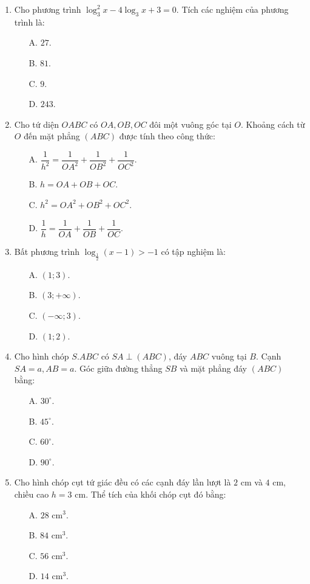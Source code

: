 \documentclass[12pt, a4paper]{article}
\begin{document}
\begin{enumerate}[leftmargin=0.8cm]
    \item Cho phương trình $\log_3^2 x - 4\log_3 x + 3 = 0$. Tích các nghiệm của phương trình là:
    \begin{enumerate}[leftmargin=0.6cm]
        \item[A.] $27$.
        \item[B.] $81$.
        \item[C.] $9$.
        \item[D.] $243$.
    \end{enumerate}

    \item Cho tứ diện $OABC$ có $OA, OB, OC$ đôi một vuông góc tại $O$. Khoảng cách từ $O$ đến mặt phẳng $(ABC)$ được tính theo công thức:
    \begin{enumerate}[leftmargin=0.6cm]
        \item[A.] $\dfrac{1}{h^2} = \dfrac{1}{OA^2} + \dfrac{1}{OB^2} + \dfrac{1}{OC^2}$.
        \item[B.] $h = OA + OB + OC$.
        \item[C.] $h^2 = OA^2 + OB^2 + OC^2$.
        \item[D.] $\dfrac{1}{h} = \dfrac{1}{OA} + \dfrac{1}{OB} + \dfrac{1}{OC}$.
    \end{enumerate}

    \item Bất phương trình $\log_{\frac{1}{2}} (x - 1) > -1$ có tập nghiệm là:
    \begin{enumerate}[leftmargin=0.6cm]
        \item[A.] $(1; 3)$.
        \item[B.] $(3; +\infty)$.
        \item[C.] $(-\infty; 3)$.
        \item[D.] $(1; 2)$.
    \end{enumerate}

    \item Cho hình chóp $S.ABC$ có $SA \perp (ABC)$, đáy $ABC$ vuông tại $B$. Cạnh $SA = a, AB = a$. Góc giữa đường thẳng $SB$ và mặt phẳng đáy $(ABC)$ bằng:
    \begin{enumerate}[leftmargin=0.6cm]
        \item[A.] $30^\circ$.
        \item[B.] $45^\circ$.
        \item[C.] $60^\circ$.
        \item[D.] $90^\circ$.
    \end{enumerate}

    \item Cho hình chóp cụt tứ giác đều có các cạnh đáy lần lượt là $2\text{ cm}$ và $4\text{ cm}$, chiều cao $h = 3\text{ cm}$. Thể tích của khối chóp cụt đó bằng:
    \begin{enumerate}[leftmargin=0.6cm]
        \item[A.] $28\text{ cm}^3$.
        \item[B.] $84\text{ cm}^3$.
        \item[C.] $56\text{ cm}^3$.
        \item[D.] $14\text{ cm}^3$.
    \end{enumerate}


\end{enumerate}
\end{document}
